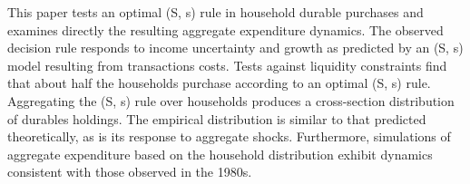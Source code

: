 This paper tests an optimal (S, s) rule in household durable purchases and examines directly the resulting aggregate expenditure dynamics. The observed decision rule responds to income uncertainty and growth as predicted by an (S, s) model resulting from transactions costs. Tests against liquidity constraints find that about half the households purchase according to an optimal (S, s) rule. Aggregating the (S, s) rule over households produces a cross-section distribution of durables holdings. The empirical distribution is similar to that predicted theoretically, as is its response to aggregate shocks. Furthermore, simulations of aggregate expenditure based on the household distribution exhibit dynamics consistent with those observed in the 1980s.